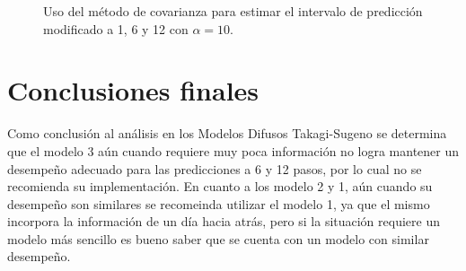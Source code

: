 \documentclass[12pt]{article}
\begin{document}
\begin{figure}[h!]
	\centering
	\captionsetup{justification=centering}
	 \newline
	\caption{Uso del método de covarianza para estimar el intervalo de predicción modificado a 1, 6 y 12 con $\alpha=10$.}
	\label{p2_j_cero}
\end{figure}

\newpage
\clearpage
\section{Conclusiones finales}
Como conclusión al análisis en los Modelos Difusos Takagi-Sugeno se determina que el modelo 3 aún cuando requiere muy poca información no logra mantener un desempeño adecuado para las predicciones a 6 y 12 pasos, por lo cual no se recomienda su implementación. En cuanto a los modelo 2 y 1, aún cuando su desempeño son similares se recomeinda utilizar el modelo 1, ya que el mismo incorpora la información de un día hacia atrás, pero si la situación requiere un modelo más sencillo es bueno saber que se cuenta con un modelo con similar desempeño.
\end{document}
